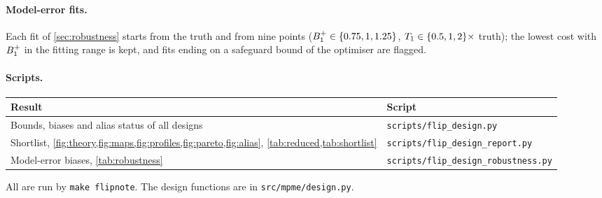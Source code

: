 \paragraph{Model-error fits.} Each fit of \cref{sec:robustness} starts from the truth and from nine
points ($B_1^{+}\in\{0.75,1,1.25\}$, $T_1\in\{0.5,1,2\}\times$ truth); the lowest cost with $B_1^{+}$ in the fitting range is
kept, and fits ending on a safeguard bound of the optimiser are flagged.

\paragraph{Scripts.}
\begin{center}
\small
\begin{tabular}{ll}
\toprule
Result & Script\\
\midrule
Bounds, biases and alias status of all designs & \texttt{scripts/flip\_design.py}\\
Shortlist, \cref{fig:theory,fig:maps,fig:profiles,fig:pareto,fig:alias}, \cref{tab:reduced,tab:shortlist} &
  \texttt{scripts/flip\_design\_report.py}\\
Model-error biases, \cref{tab:robustness} & \texttt{scripts/flip\_design\_robustness.py}\\
\bottomrule
\end{tabular}
\end{center}
All are run by \texttt{make flipnote}. The design functions are in \texttt{src/mpme/design.py}.
